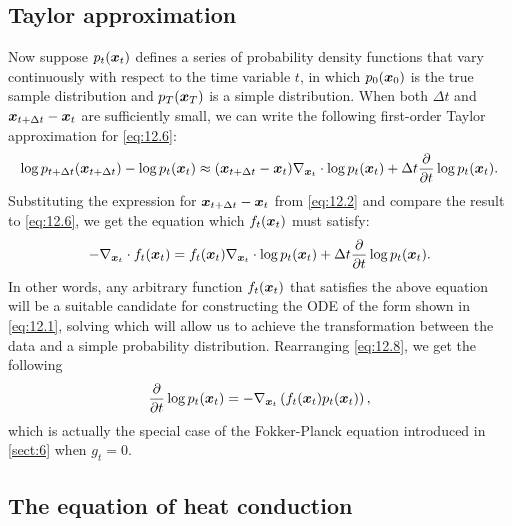\subsection{Taylor approximation}
Now suppose $p_t(\bm{x}_{t})$ defines a series of probability density functions that vary continuously with respect to the time variable $t$, in which $p_0(\bm{x}_0)$ is the true sample distribution and $p_{T}(\bm{x}_T)$ is a simple distribution. When both $\Delta t$ and $\bm{x}_{t+\Delta t}-\bm{x}_{t}$ are sufficiently small, we can write the following first-order Taylor approximation for \cref{eq:12.6}:
\begin{equation}
\label{eq:12.7}
\log p_{t+\Delta t}(\bm{x}_{t+\Delta t}) -\log p_t(\bm{x}_{t}) \approx(\bm{x}_{t+\Delta t}-\bm{x}_{t})\nabla_{\bm{x}_{t}}\cdot\log p_t (\bm{x}_{t}) +\Delta t\frac{\partial}{\partial t}\log p_t (\bm{x}_{t}).
\end{equation}
Substituting the expression for $\bm{x}_{t+\Delta t}-\bm{x}_{t}$ from \cref{eq:12.2} and compare the result to \cref{eq:12.6}, we get the equation which $f_t(\bm{x}_{t})$ must satisfy:
\begin{equation}
    \label{eq:12.8}
    -\nabla_{\bm{x}_{t}}\cdot f_t(\bm{x}_{t})=f_t(\bm{x}_{t}) \nabla_{\bm{x}_{t}}\cdot\log p_t (\bm{x}_{t}) +\Delta t\frac{\partial}{\partial t}\log p_t (\bm{x}_{t}).
\end{equation}
In other words, any arbitrary function $f_t(\bm{x}_{t})$ that satisfies the above equation will be a suitable candidate for constructing the ODE of the form shown in \cref{eq:12.1}, solving which will allow us to achieve the transformation between the data and a simple probability distribution. Rearranging \cref{eq:12.8}, we get the following
\begin{equation}
    \label{eq:12.9}
    \frac{\partial}{\partial t}\log p_t(\bm{x}_{t})=-\nabla_{\bm{x}_{t}} \left( f_t(\bm{x}_{t})p_t(\bm{x}_{t})  \right),
\end{equation}
which is actually the special case of the Fokker-Planck equation introduced in \cref{sect:6} when $g_t=0$.

\subsection{The equation of heat conduction}

